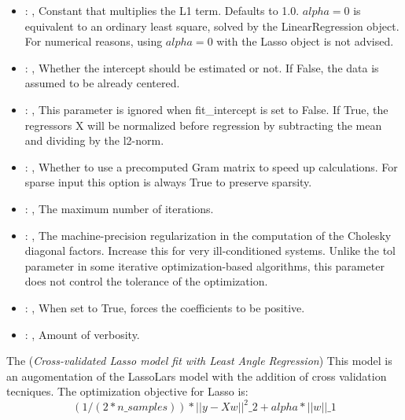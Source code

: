 \begin{itemize}
    \item {}: , 
      Constant that multiplies the L1 term. Defaults to 1.0.
      $alpha = 0$ is equivalent to an ordinary least square, solved by
      the LinearRegression object. For numerical reasons, using $alpha = 0$
      with the Lasso object is not advised.

    \item {}: , 
      Whether the intercept should be estimated or not. If False,
      the data is assumed to be already centered.

    \item {}: , 
      This parameter is ignored when fit\_intercept is set to False. If True,
      the regressors X will be normalized before regression by subtracting the mean and
      dividing by the l2-norm.

    \item {}: , 
      Whether to use a precomputed Gram matrix to speed up calculations.
      For sparse input this option is always True to preserve sparsity.

    \item {}: , 
      The maximum number of iterations.

    \item {}: , 
      The machine-precision regularization in the computation of the Cholesky
      diagonal factors. Increase this for very ill-conditioned systems. Unlike the tol
      parameter in some iterative optimization-based algorithms, this parameter does not
      control the tolerance of the optimization.

    \item {}: , 
      When set to True, forces the coefficients to be positive.

    \item {}: , 
      Amount of verbosity.
  \end{itemize}
 The  (\textit{Cross-validated Lasso model fit with Least Angle Regression})
 This model is an augomentation of the LassoLars model with the addition of
 cross validation tecniques.                         The optimization objective for Lasso is:
 \begin{equation}                          (1 / (2 * n\_samples)) * ||y - Xw||^2\_2 + alpha *
 ||w||\_1                         \end{equation}

